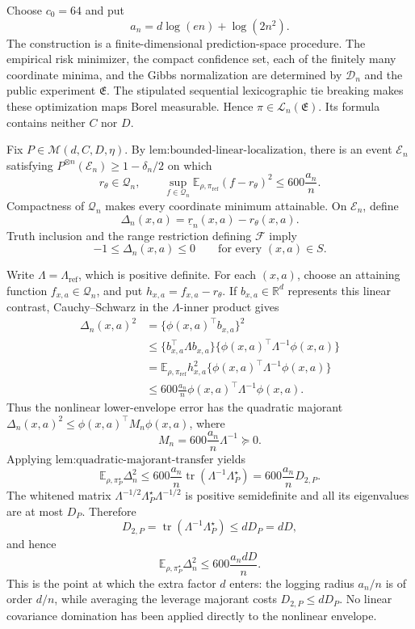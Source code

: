 Choose \(c_0=64\) and put
\[
a_n=d\log(en)+\log(2n^2).
\]
The construction is a finite-dimensional prediction-space procedure. The empirical risk minimizer, the compact confidence set, each of the finitely many coordinate minima, and the Gibbs normalization are determined by \(\mathcal D_n\) and the public experiment \(\mathfrak E\). The stipulated sequential lexicographic tie breaking makes these optimization maps Borel measurable. Hence \(\widehat\pi\in\mathcal L_n(\mathfrak E)\). Its formula contains neither \(C\) nor \(D\).

Fix \(P\in\mathcal M(d,C,D,\eta)\). By \(\text{lem:bounded-linear-localization}\), there is an event \(\mathcal E_n\) satisfying \(P^{\otimes n}(\mathcal E_n)\ge1-\delta_n/2\) on which
\[
r_\theta\in\mathcal Q_n,
\qquad
\sup_{f\in\mathcal Q_n}\mathbb E_{\rho,\pi_{\mathrm{ref}}}(f-r_\theta)^2
\le 600\frac{a_n}{n}.
\]
Compactness of \(\mathcal Q_n\) makes every coordinate minimum attainable. On \(\mathcal E_n\), define
\[
\Delta_n(x,a)=\underline r_n(x,a)-r_\theta(x,a).
\]
Truth inclusion and the range restriction defining \(\mathcal F\) imply
\[
-1\le\Delta_n(x,a)\le0
\qquad\text{for every }(x,a)\in S.
\]

Write \(\Lambda=\Lambda_{\mathrm{ref}}\), which is positive definite. For each \((x,a)\), choose an attaining function \(f_{x,a}\in\mathcal Q_n\), and put \(h_{x,a}=f_{x,a}-r_\theta\). If \(b_{x,a}\in\mathbb R^d\) represents this linear contrast, Cauchy--Schwarz in the \(\Lambda\)-inner product gives
\[
\begin{aligned}
\Delta_n(x,a)^2
&=\{\phi(x,a)^\top b_{x,a}\}^2\\
&\le \{b_{x,a}^\top\Lambda b_{x,a}\}
   \{\phi(x,a)^\top\Lambda^{-1}\phi(x,a)\}\\
&=\mathbb E_{\rho,\pi_{\mathrm{ref}}}h_{x,a}^2
   \{\phi(x,a)^\top\Lambda^{-1}\phi(x,a)\}\\
&\le 600\frac{a_n}{n}\phi(x,a)^\top\Lambda^{-1}\phi(x,a).
\end{aligned}
\]
Thus the nonlinear lower-envelope error has the quadratic majorant \(\Delta_n(x,a)^2\le\phi(x,a)^\top M_n\phi(x,a)\), where
\[
M_n=600\frac{a_n}{n}\Lambda^{-1}\succeq0.
\]
Applying \(\text{lem:quadratic-majorant-transfer}\) yields
\[
\mathbb E_{\rho,\pi_P^\star}\Delta_n^2
\le600\frac{a_n}{n}\operatorname{tr}(\Lambda^{-1}\Lambda_P^\star)
=600\frac{a_n}{n}D_{2,P}.
\]
The whitened matrix \(\Lambda^{-1/2}\Lambda_P^\star\Lambda^{-1/2}\) is positive semidefinite and all its eigenvalues are at most \(D_P\). Therefore
\[
D_{2,P}=\operatorname{tr}(\Lambda^{-1}\Lambda_P^\star)
\le dD_P=dD,
\]
and hence
\[
\mathbb E_{\rho,\pi_P^\star}\Delta_n^2
\le600\frac{a_ndD}{n}.
\]
This is the point at which the extra factor \(d\) enters: the logging radius \(a_n/n\) is of order \(d/n\), while averaging the leverage majorant costs \(D_{2,P}\le dD_P\). No linear covariance domination has been applied directly to the nonlinear envelope.

